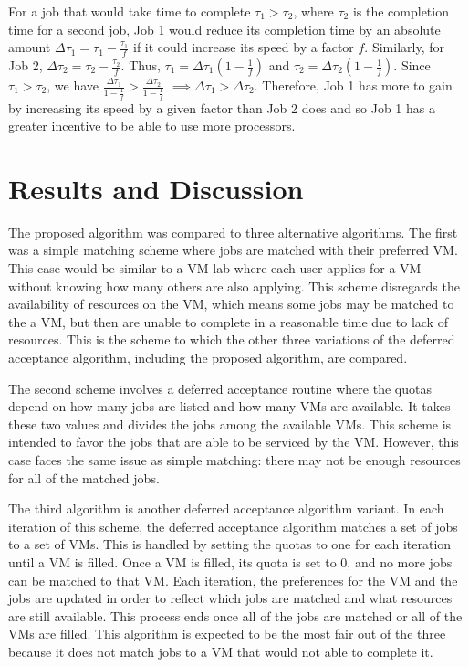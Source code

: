 \documentclass[conference]{IEEEtran}
\begin{document}
For a job that would take time to complete 
\(\tau_1 > \tau_2\), where \(\tau_2\) is the
completion time for a second job,
Job 1 would reduce its completion time by an 
absolute amount 
\(\Delta \tau_1 = \tau_1-\frac{\tau_1}{f}\) 
if it could increase its speed by a factor \(f\).
Similarly, for Job 2, 
\(\Delta \tau_2 = \tau_2-\frac{\tau_2}{f}\).
Thus, 
\(\tau_1=\Delta \tau_1(1-\frac{1}{f})\)
and
\(\tau_2=\Delta \tau_2(1-\frac{1}{f})\).
Since 
\(\tau_1 > \tau_2\), we have
\(\frac{\Delta\tau_1}{1-\frac{1}{f}} > \frac{\Delta\tau_2}{1-\frac{1}{f}}\) 
\(\implies \Delta \tau_1 > \Delta \tau_2\).
Therefore, Job 1 has more to gain by increasing its speed by 
a given factor than Job 2 does and so Job 1 has a greater incentive
to be able to use more processors.




\section{Results and Discussion}
\label{sec:results}
The proposed algorithm was compared to three alternative algorithms.  
The first was a simple matching scheme where jobs are matched with their preferred VM.  
This case would be similar to a VM lab where each user applies for a VM without knowing how many others are also applying.
This scheme disregards the availability of resources on the VM, which means some jobs may be matched to the a VM, but then are unable to complete in a reasonable time due to lack of resources.  
This is the scheme to which the other three variations of the deferred acceptance algorithm, including the proposed algorithm, are compared.

The second scheme involves a deferred acceptance routine where the quotas depend on how many jobs are listed and how many VMs are available.  
It takes these two values and divides the jobs among the available VMs.  
This scheme is intended to favor the jobs that are able to be serviced by the VM.  
However, this case faces the same issue as simple matching: there may not be enough resources for all of the matched jobs.  

The third algorithm is another deferred acceptance algorithm variant.  
In each iteration of this scheme, the deferred acceptance algorithm matches a set of jobs to a set of VMs.
This is handled by setting the quotas to one for each iteration until a VM is filled.  
Once a VM is filled, its quota is set to 0, and no more jobs can be matched to that VM.  
Each iteration, the preferences for the VM and the jobs are updated in order to reflect which jobs are matched and what resources are still available.  
This process ends once all of the jobs are matched or all of the VMs are filled.  
This algorithm is expected to be the most fair out of the three because it does not match jobs to a VM that would not able to complete it.
  
\end{document}
